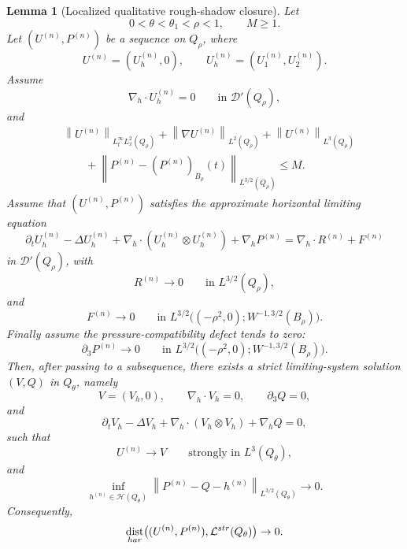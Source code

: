 \documentclass[10pt,a4paper]{amsart}
\newtheorem{lemma}{Lemma}
\newcommand{\calH}{\mathcal H}
\newcommand{\calL}{\mathcal L}
\DeclareMathOperator{\dist}{dist}
\newcommand{\divh}{\nabla_h\!\cdot}
\newcommand{\nabh}{\nabla_h}
\newcommand{\norm}[2]{\left\|#1\right\|_{#2}}
\begin{document}
\begin{lemma}[Localized qualitative rough-shadow closure]
\label{pI:lem:localized-qual-rough-shadow}
Let
\[
        0<\theta<\theta_1<\rho<1,
        \qquad
        M\ge1 .
\]
Let \((U^{(n)},P^{(n)})\) be a sequence on \(Q_\rho\), where
\[
        U^{(n)}=(U_h^{(n)},0),
        \qquad
        U_h^{(n)}=(U_1^{(n)},U_2^{(n)}).
\]
Assume
\[
        \divh U_h^{(n)}=0
        \qquad\text{in }\mathcal D'(Q_\rho),
\]
and
\begin{equation}\label{pI:eq:rough-shadow-uniform-bounds}
\begin{aligned}
&\norm{U^{(n)}}{L^\infty_tL^2_x(Q_\rho)}
+
\norm{\nabla U^{(n)}}{L^2(Q_\rho)}
+
\norm{U^{(n)}}{L^3(Q_\rho)}
\nonumber\\
&\qquad
+
\norm{P^{(n)}-(P^{(n)})_{B_\rho}(t)}{L^{3/2}(Q_\rho)}
\le M .
\end{aligned}
\end{equation}
Assume that \((U^{(n)},P^{(n)})\) satisfies the approximate horizontal limiting equation
\begin{equation}\label{pI:eq:approx-horizontal-limiting}
\partial_t U_h^{(n)}
-\Delta U_h^{(n)}
+\divh(U_h^{(n)}\otimes U_h^{(n)})
+\nabh P^{(n)}
=
\divh R^{(n)}+F^{(n)}
\end{equation}
in \(\mathcal D'(Q_\rho)\), with
\[
        R^{(n)}\to0
        \qquad\text{in }L^{3/2}(Q_\rho),
\]
and
\[
        F^{(n)}\to0
        \qquad\text{in }
        L^{3/2}\bigl((-\rho^2,0);W^{-1,3/2}(B_\rho)\bigr).
\]
Finally assume the pressure-compatibility defect tends to zero:
\[
        \partial_3P^{(n)}\to0
        \qquad\text{in }
        L^{3/2}\bigl((-\rho^2,0);W^{-1,3/2}(B_\rho)\bigr).
\]
Then, after passing to a subsequence, there exists a strict limiting-system solution \((V,Q)\) in \(Q_\theta\), namely
\[
        V=(V_h,0),
        \qquad
        \divh V_h=0,
        \qquad
        \partial_3Q=0,
\]
and
\[
        \partial_tV_h-\Delta V_h
        +\divh(V_h\otimes V_h)+\nabh Q=0,
\]
such that
\[
        U^{(n)}\to V
        \qquad\text{strongly in }L^3(Q_\theta),
\]
and
\[
        \inf_{h^{(n)}\in\calH(Q_\theta)}
        \norm{P^{(n)}-Q-h^{(n)}}{L^{3/2}(Q_\theta)}
        \to0 .
\]
Consequently,
\[
        \dist_{\rm har}
        \bigl((U^{(n)},P^{(n)}),\calL^{\rm str}(Q_\theta)\bigr)
        \to0 .
\]
\end{lemma}
\end{document}
